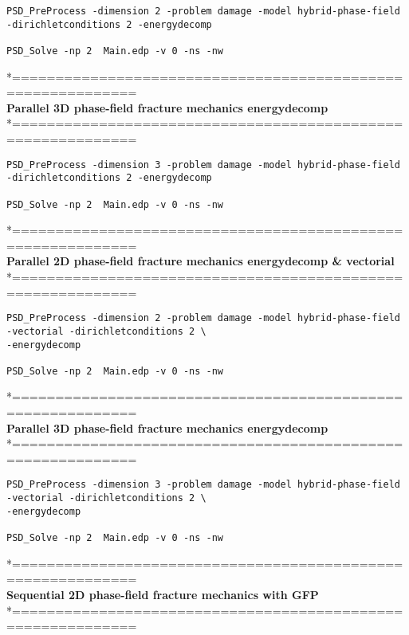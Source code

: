 \begin{lstlisting}[style=BashInputStyle]
PSD_PreProcess -dimension 2 -problem damage -model hybrid-phase-field -dirichletconditions 2 -energydecomp   

PSD_Solve -np 2  Main.edp -v 0 -ns -nw   
\end{lstlisting}
*============================================================\\
\textbf{ Parallel 3D phase-field fracture mechanics energydecomp }\\
*============================================================\\
\begin{lstlisting}[style=BashInputStyle]
PSD_PreProcess -dimension 3 -problem damage -model hybrid-phase-field -dirichletconditions 2 -energydecomp   

PSD_Solve -np 2  Main.edp -v 0 -ns -nw   
\end{lstlisting}
*============================================================\\
\textbf{ Parallel 2D phase-field fracture mechanics energydecomp \& vectorial}\\
*============================================================\\
\begin{lstlisting}[style=BashInputStyle]
PSD_PreProcess -dimension 2 -problem damage -model hybrid-phase-field -vectorial -dirichletconditions 2 \
-energydecomp   

PSD_Solve -np 2  Main.edp -v 0 -ns -nw   
\end{lstlisting}
*============================================================\\
\textbf{ Parallel 3D phase-field fracture mechanics energydecomp }\\
*============================================================\\
\begin{lstlisting}[style=BashInputStyle]
PSD_PreProcess -dimension 3 -problem damage -model hybrid-phase-field -vectorial -dirichletconditions 2 \
-energydecomp   

PSD_Solve -np 2  Main.edp -v 0 -ns -nw   
\end{lstlisting}
*============================================================\\
\textbf{ Sequential 2D phase-field fracture mechanics with GFP }\\
*============================================================\\
